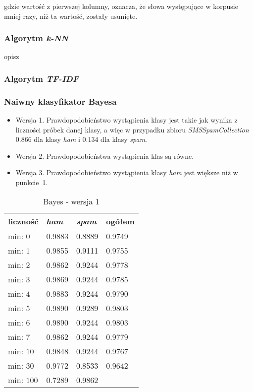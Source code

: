 \documentclass[a4paper,12pt]{article}
\begin{document}
gdzie wartość z pierwszej kolumny, oznacza, że słowa występujące w korpusie mniej razy, niż ta wartość, zostały usunięte.

\subsubsection{Algorytm \textit{k-NN}}

opisz

\subsubsection{Algorytm \textit{TF-IDF}}

\subsubsection{Naiwny klasyfikator Bayesa}

\begin{itemize}
\item Wersja 1. Prawdopodobieństwo wystąpienia klasy jest takie jak wynika z liczności próbek danej klasy, a więc w przypadku zbioru 
	\textit{SMSSpamCollection} $0.866$ dla klasy \textit{ham} i $0.134$ dla klasy \textit{spam}.
\item Wersja 2. Prawdopodobieństwa wystąpienia klas są równe.
\item Wersja 3. Prawdopodobieństwo wystąpienia klasy \textit{ham} jest większe niż w punkcie~1.
\end{itemize}

\vspace{0.5cm}

\begin{table}
\centering
\begin{tabular}{|l||p{2.5cm}|p{2.5cm}||p{2.5cm}|}
\hline
liczność & \textit{ham} & \textit{spam} & ogółem \\ \hline
min: $0$ & 0.9883 & 0.8889 & 0.9749 \\ \hline
min: $1$ & 0.9855 & 0.9111 & 0.9755 \\ \hline
min: $2$ & 0.9862 & 0.9244 & 0.9778 \\ \hline
min: $3$ & 0.9869 & 0.9244 & 0.9785 \\ \hline
min: $4$ & 0.9883 & 0.9244 & 0.9790 \\ \hline
min: $5$ & 0.9890 & 0.9289 & 0.9803 \\ \hline
min: $6$ & 0.9890 & 0.9244 & 0.9803 \\ \hline
min: $7$ & 0.9862 & 0.9244 & 0.9779 \\ \hline
min: $10$ & 0.9848 & 0.9244 & 0.9767 \\ \hline
min: $30$ & 0.9772 & 0.8533 & 0.9642 \\ \hline
min: $100$ & 0.7289 & 0.9862 & \\ \hline

\end{tabular}
\caption{Bayes - wersja 1}
\end{table}
\end{document}
